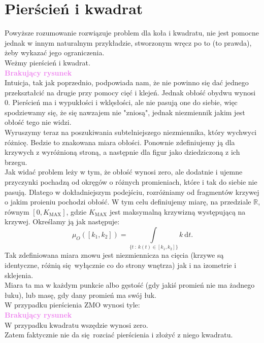 \documentclass[a4paper, 12pt]{article}
\newcommand{\rysunek}[1]{\hfill \break\\[16pt] \Huge \textbf{\textcolor{violet}{Brakujący rysunek \normalsize
#1}} \hfill
\break \\[16pt] \normalsize}
\begin{document}
\section{Pierścień i kwadrat}
Powyższe rozumowanie rozwiązuje problem dla koła i kwadratu, nie jest pomocne jednak w innym naturalnym
przykładzie, stworzonym wręcz po to (to prawda), żeby wykazać jego ograniczenia. \\
Weżmy pierścień i kwadrat.
\rysunek{}
Intuicja, tak jak poprzednio, podpowiada nam, że nie powinno się dać jednego przekształcić na drugie
przy pomocy cięć i klejeń. Jednak obłość obydwu wynosi $0$.
Pierścień ma i wypukłości i wklęsłości, ale nie pasują one do siebie, więc spodziewamy się, że się nawzajem
nie "zniosą", jednak niezmiennik jakim jest obłość tego nie widzi. \\
Wyruszymy teraz na poszukiwania subtelniejszego niezmiennika, który wychwyci różnicę. Bedzie to
znakowana miara obłości. Ponownie zdefiniujemy ją dla krzywych z wyróżnioną stroną, a następnie
dla figur jako dziedziczoną z ich brzegu. \\
Jak widać problem leży w tym, że obłość wynosi zero, ale dodatnie i ujemne przyczynki pochadzą od okręgów
o różnych promieniach, które i tak do siebie nie pasują. Dlatego w dokładniejszym podejściu, rozróżniamy
od fragmentów krzywej o jakim proieniu pochodzi obłość. W tym celu definiujemy miarę, na przedziale
$\mathbb{R}$, równym $[0, K_\text{MAX}]$, gdzie $K_\text{MAX}$ jest maksymalną krzywizną występującą na
krzywej. Określamy ją jak następuje:
\begin{equation}
    \mu_O([k_1, k_2]) = \displaystyle\int\limits_{\{t\ :\ k(t) \in [k_1, k_2]\}}
    k\ \textrm{d}t.
\end{equation}
Tak zdefiniowana miara znowu jest niezmiennicza na cięcia (krzywe są identyczne, różnią się wyłącznie co do
strony wnętrza) jak i na izometrie i sklejenia. \\
Miara ta ma w każdym punkcie albo gęstość (gdy jakiś promień nie ma żadnego łuku), lub masę, gdy dany promień
 ma swój łuk. \\
 W przypadku pierścienia ZMO wynosi tyle:
 \rysunek{}
 W przypadku kwadratu wszędzie wynosi zero. \\
 Zatem faktycznie nie da się rozciać pierścienia i złożyć z niego kwadratu. \\
\end{document}
